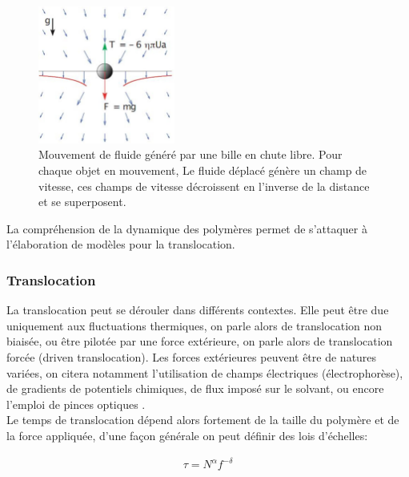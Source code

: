 \documentclass[a4paper,11pt]{article}
\begin{document}
\begin{figure}[H]
\begin{center}
\includegraphics[width=0.4\textwidth]{hydrodyninterac.jpg} 

\caption{Mouvement de fluide généré par une bille en chute libre. Pour chaque objet en mouvement, Le fluide déplacé génère un champ de vitesse, ces champs de vitesse décroissent en l'inverse de la distance et se superposent.}
\label{hydrodyninterac}
\end{center}
\end{figure}

La compréhension de la dynamique des polymères permet de s'attaquer à l'élaboration de modèles pour la translocation.










\subsubsection{Translocation}



La translocation peut se dérouler dans différents contextes. Elle peut être due uniquement aux fluctuations thermiques, on parle alors de translocation non biaisée, ou être pilotée par une force extérieure, on parle alors de translocation forcée (driven translocation). Les forces extérieures peuvent être de natures variées, on citera notamment l'utilisation de champs électriques (électrophorèse), de gradients de potentiels chimiques, de flux imposé sur le solvant, ou encore l'emploi de pinces optiques \cite{keyser}.\\

Le temps de translocation dépend alors fortement de la taille du polymère et de la force appliquée, d'une façon générale on peut définir des lois d'échelles:

\begin{eqnarray}
\tau = N^\alpha f^{-\delta}
\label{tau}
\end{eqnarray}
\end{document}
